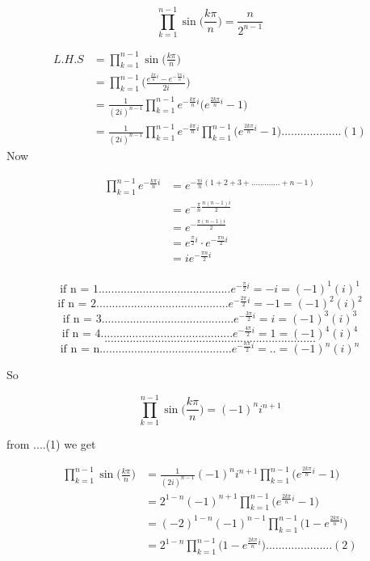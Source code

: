 \documentclass[fleqn]{article}
\begin{document}
$$\prod_{k=1}^{n-1}\sin\bigg(\frac{k \pi}{n}\bigg) = \frac{n}{2^{n-1}}$$

\begin{align*}
L.H.S &= \prod_{k=1}^{n-1}\sin\bigg(\frac{k \pi}{n}\bigg)\\
	  &=\prod_{k=1}^{n-1}\bigg(\frac{e^{\frac{k \pi}{n}i}-e^{-\frac{k \pi}{n}i}}{2i}\bigg)\\
	  &=\frac{1}{(2i)^{n-1}}\prod_{k=1}^{n-1}e^{-\frac{k \pi}{n}i}\bigg(e^{\frac{2k\pi}{n}i}-1\bigg)\\
	  &=\frac{1}{(2i)^{n-1}}\prod_{k=1}^{n-1}e^{-\frac{k \pi}{n}i}\prod_{k=1}^{n-1}\bigg(e^{\frac{2k\pi}{n}i}-1\bigg)...................(1)
	  \label{eq:1}
\end{align*}
Now 

\begin{align*}
\prod_{k=1}^{n-1}e^{-\frac{k \pi}{n}i} &= e^{-\frac{\pi i}{n}(1+2+3+.............+n-1)}\\
									   &= e^{-\frac{\pi}{n}\frac{n(n-1)i}{2}}\\
									   &= e^{-\frac{\pi (n-1)i}{2}}\\
									   &= e^{\frac{\pi}{2}i}\cdot e^{-\frac{\pi n}{2}i}\\
									   &= ie^{-\frac{\pi n}{2}i}\\
\end{align*}

$$\text{if n = 1..........................................} e^{-\frac{\pi}{2}i} = -i = (-1)^{1}(i)^{1}$$
$$\text{if n = 2..........................................} e^{-\frac{2\pi}{2}i} = -1 = (-1)^{2}(i)^{2}$$
$$\text{if n = 3..........................................} e^{-\frac{3\pi}{2}i} = i = (-1)^{3}(i)^{3}$$
$$\text{if n = 4..........................................} e^{-\frac{4\pi}{2}i} = 1 = (-1)^{4}(i)^{4}$$
$$...................................................................$$
$$\text{if n = n..........................................} e^{-\frac{n\pi}{2}i} = .. = (-1)^{n}(i)^{n}$$

So

$$\prod_{k=1}^{n-1}\sin\bigg(\frac{k \pi}{n}\bigg) = (-1)^{n}i^{n+1}$$

\vspace{155pt}

from ....(1) we get

\begin{align*}
\prod_{k=1}^{n-1}\sin\bigg(\frac{k \pi}{n}\bigg) &= \frac{1}{(2i)^{n-1}}(-1)^{n}i^{n+1}\prod_{k=1}^{n-1}\bigg(e^{\frac{2k\pi}{n}i}-1\bigg)\\
												 &=2^{1-n}(-1)^{n+1}\prod_{k=1}^{n-1}\bigg(e^{\frac{2k\pi}{n}i}-1\bigg)\\
												 &=(-2)^{1-n}(-1)^{n-1}\prod_{k=1}^{n-1}\bigg(1-e^{\frac{2k\pi}{n}i}\bigg)\\
												 &=2^{1-n}\prod_{k=1}^{n-1}\bigg(1-e^{\frac{2k\pi}{n}i}\bigg).....................(2)\\
\end{align*}
\end{document}

